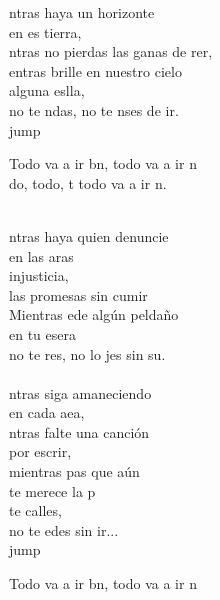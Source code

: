\begin{cancion}%
	ntras haya un horizonte \\
	en es tierra,\\
	ntras no pierdas las ganas de rer,\\
	entras brille en nuestro cielo\\
	alguna eslla,\\
	no te ndas, no te nses de ir.\\jump\\
	\begin{chorus}%
	Todo va a ir bn, todo va a ir n\\
	do, todo, t todo va a ir n.\\
	\end{chorus}%
	\jump\\
	ntras haya quien denuncie \\
	en las aras\\
	injusticia, \\
	las promesas sin cumir\\
	Mientras ede algún peldaño \\
	en tu esera\\
	no te res, no lo jes sin su.\\
	\jump\\
	ntras siga amaneciendo\\
	en cada aea,\\
	ntras falte una canción\\
	por escrir,\\
	mientras pas que aún\\
	te merece la p\\
	 te calles, \\
	no te edes sin ir...\\jump\\
	\begin{chorus}%
	Todo va a ir bn, todo va a ir n\\

\end{chorus}
\end{cancion}
